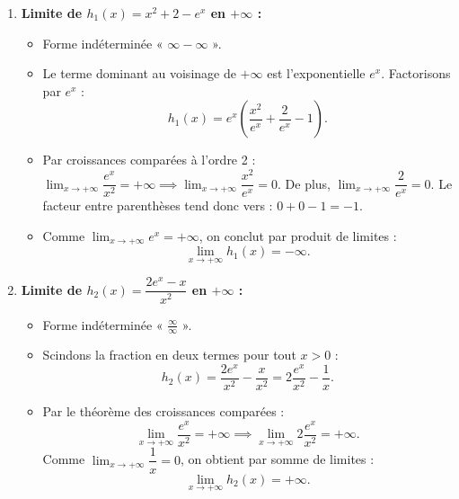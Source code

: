 \documentclass[11pt,a4paper]{article}
\begin{document}
\begin{correctionbox}[Exercice 11]
\begin{enumerate}[label=\textbf{\arabic*.}]
    \item \textbf{Limite de $h_1(x) = x^2 + 2 - e^x$ en $+\infty$ :}
    \begin{itemize}
        \item Forme indéterminée « $\infty - \infty$ ».
        \item Le terme dominant au voisinage de $+\infty$ est l'exponentielle $e^x$. Factorisons par $e^x$ :
        \[
        h_1(x) = e^x \left(\frac{x^2}{e^x} + \frac{2}{e^x} - 1\right).
        \]
        \item Par croissances comparées à l'ordre 2 : $\lim_{x \to +\infty} \dfrac{e^x}{x^2} = +\infty \implies \lim_{x \to +\infty} \dfrac{x^2}{e^x} = 0$.
        De plus, $\lim_{x \to +\infty} \dfrac{2}{e^x} = 0$.
        Le facteur entre parenthèses tend donc vers : $0 + 0 - 1 = -1$.
        \item Comme $\lim_{x \to +\infty} e^x = +\infty$, on conclut par produit de limites :
        \[
        \boxed{\lim_{x \to +\infty} h_1(x) = -\infty}.
        \]
    \end{itemize}

    \item \textbf{Limite de $h_2(x) = \dfrac{2e^x - x}{x^2}$ en $+\infty$ :}
    \begin{itemize}
        \item Forme indéterminée « $\frac{\infty}{\infty}$ ».
        \item Scindons la fraction en deux termes pour tout $x > 0$ :
        \[
        h_2(x) = \frac{2e^x}{x^2} - \frac{x}{x^2} = 2 \frac{e^x}{x^2} - \frac{1}{x}.
        \]
        \item Par le théorème des croissances comparées :
        \[
        \lim_{x \to +\infty} \frac{e^x}{x^2} = +\infty \implies \lim_{x \to +\infty} 2\frac{e^x}{x^2} = +\infty.
        \]
        Comme $\lim_{x \to +\infty} \dfrac{1}{x} = 0$, on obtient par somme de limites :
        \[
        \boxed{\lim_{x \to +\infty} h_2(x) = +\infty}.
        \]
    \end{itemize}


\end{enumerate}
\end{correctionbox}
\end{document}

